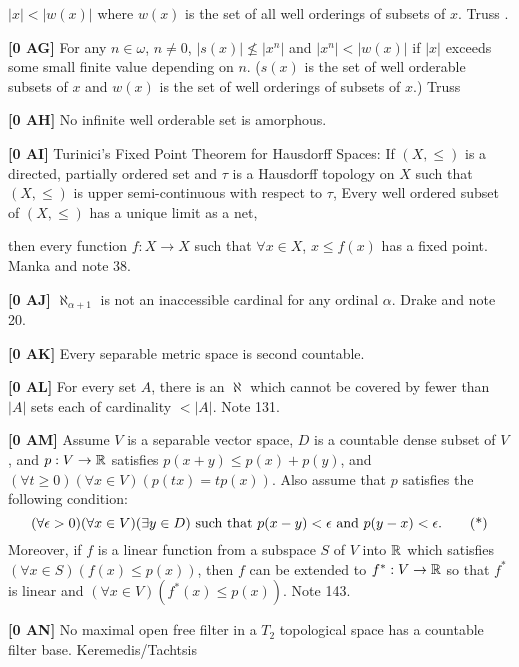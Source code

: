 $|x| < |w(x)|$ where $w(x)$ is the set of all well orderings of subsets of
$x$.  \ac{Truss} \cite{1973d}.
\smallskip
\item{}{\bf [0 AG]} For any $n\in\omega$, $n\neq 0$, $|s(x)|\not\le |x^n|$
and $|x^n|< |w(x)|$ if $|x|$ exceeds some small finite value depending on
$n$.  ($s(x) $ is the set of well orderable subsets of $x$ and $w(x)$ is
the set of well orderings of subsets of $x$.)  \ac{Truss} \cite{1973d}
\smallskip
\item{}{\bf [0 AH]}  No infinite well orderable set is amorphous.
\smallskip
\item{}{\bf [0 AI]} Turinici's Fixed Point Theorem for Hausdorff Spaces:
If $(X,\le)$ is a directed, partially ordered set and $\tau$ is a
Hausdorff topology on $X$ such that
 $(X,\le)$ is upper semi-continuous with respect to $\tau$,
 Every well ordered subset of $(X,\le)$ has a unique
limit as a net, \par
\item{}then every function $f:X\to X$ such that $\forall x\in X$,
$x\le f(x)$ has a fixed point. \ac{Manka} \cite{1988b} and note 38.
\smallskip
\item{}{\bf [0 AJ] }  $\aleph_{\alpha+1}$ is not an inaccessible cardinal
for any ordinal $\alpha$.  \ac{Drake} \cite{1974} and note 20.
\smallskip
\item{}{\bf [0 AK]} Every separable metric space is second countable.
\smallskip
\item{}{\bf [0 AL]} For every set $A$, there is an $\aleph$ which cannot
be covered by fewer than $|A|$ sets each of cardinality $< |A|$. Note 131.
\smallskip
\item{}{\bf [0 AM]} Assume $V$ is a separable vector space, $D$ is
a countable dense subset of $V$, and $p :V \to \Bbb R$ satisfies
$p(x+y) \le p(x) + p(y)$, and
$(\forall t\ge 0)(\forall x\in V)(p(tx) = tp(x))$. Also assume that
$p$ satisfies the following condition:
$$(\forall \epsilon > 0)(\forall x\in V)(\exists y\in D)\hbox{ such that }
p(x - y) < \epsilon\hbox{ and }p(y - x) < \epsilon.\tag*$$
Moreover, if $f$ is a linear function from a subspace $S$ of $V$ into
$\Bbb R$ which satisfies $(\forall x \in S)(f(x) \le p(x))$, then $f$ can
be extended to $f^* :V \to \Bbb R$ so that $f^* $ is linear and
$(\forall x \in V)(f^*(x) \le p(x))$. Note 143.
\smallskip
\item{}{\bf [0 AN]} No maximal open free filter in a $T_2$ topological
space has a countable filter base. \ac{Keremedis/Tachtsis} \cite{1999b}
